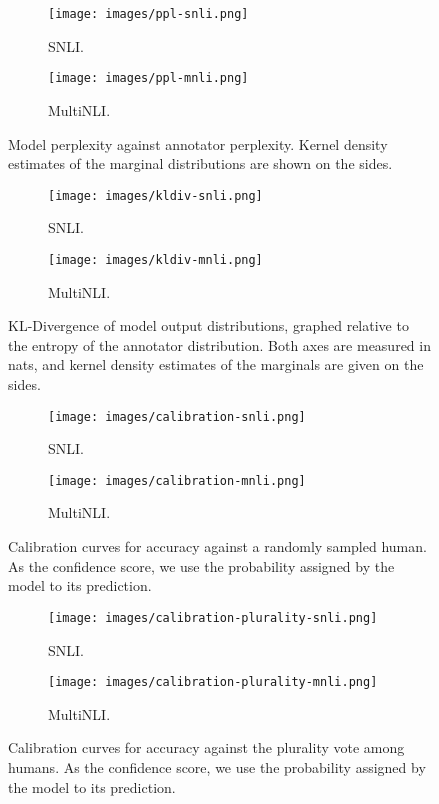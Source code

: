 \documentclass[10pt,a4paper]{article}
\begin{document}
\begin{figure*}[t!]
\centering
\begin{subfigure}[b]{0.45\textwidth}
\texttt{[image: images/ppl-snli.png]}
\caption{SNLI.}
\end{subfigure}
\hfill
\begin{subfigure}[b]{0.45\textwidth}
\texttt{[image: images/ppl-mnli.png]}
\caption{MultiNLI.}
\end{subfigure}
\caption{
  Model perplexity against annotator perplexity. Kernel density estimates of the marginal distributions are shown on the sides. \label{fig:ppl-graphs}}
\end{figure*}

\begin{figure*}[t!]
\centering
\begin{subfigure}[b]{0.45\textwidth}
\texttt{[image: images/kldiv-snli.png]}
\caption{SNLI.}
\end{subfigure}
\hfill
\begin{subfigure}[b]{0.45\textwidth}
\texttt{[image: images/kldiv-mnli.png]}
\caption{MultiNLI.}
\end{subfigure}
\caption{
  KL-Divergence of model output distributions, graphed relative to the entropy of the annotator distribution. Both axes are measured in nats, and kernel density estimates of the marginals are given on the sides.\label{fig:kldiv-graphs}}
\end{figure*}

\begin{figure*}[t!]
\centering
\begin{subfigure}[b]{0.45\textwidth}
\texttt{[image: images/calibration-snli.png]}
\caption{SNLI.}
\end{subfigure}
\hfill
\begin{subfigure}[b]{0.45\textwidth}
\texttt{[image: images/calibration-mnli.png]}
\caption{MultiNLI.}
\end{subfigure}
\caption{
  Calibration curves for accuracy against a randomly sampled human. As the confidence score, we use the probability assigned by the model to its prediction.
  \label{fig:calibration-graphs}}
\end{figure*}

\begin{figure*}[t!]
\centering
\begin{subfigure}[b]{0.45\textwidth}
\texttt{[image: images/calibration-plurality-snli.png]}
\caption{SNLI.}
\end{subfigure}
\hfill
\begin{subfigure}[b]{0.45\textwidth}
\texttt{[image: images/calibration-plurality-mnli.png]}
\caption{MultiNLI.}
\end{subfigure}
\caption{
  Calibration curves for accuracy against the plurality vote among humans. As the confidence score, we use the probability assigned by the model to its prediction.
  \label{fig:calibration-graphs-plurality}}
\end{figure*}
\end{document}
